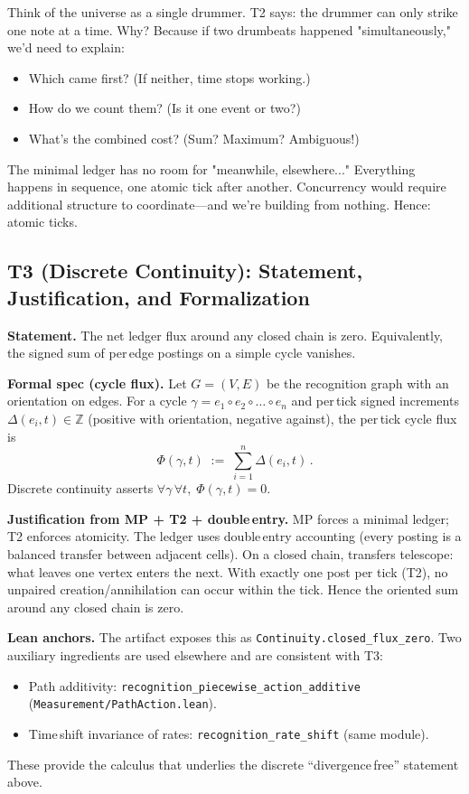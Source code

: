 \documentclass[11pt]{article}
\begin{document}
\begin{intuitionbox}
Think of the universe as a single drummer. T2 says: the drummer can only strike one note at a time. Why? Because if two drumbeats happened "simultaneously," we'd need to explain:
\begin{itemize}
  \item Which came first? (If neither, time stops working.)
  \item How do we count them? (Is it one event or two?)
  \item What's the combined cost? (Sum? Maximum? Ambiguous!)
\end{itemize}

The minimal ledger has no room for "meanwhile, elsewhere..." Everything happens in sequence, one atomic tick after another. Concurrency would require additional structure to coordinate—and we're building from nothing. Hence: atomic ticks.
\end{intuitionbox}

\subsection*{T3 (Discrete Continuity): Statement, Justification, and Formalization}
\textbf{Statement.} The net ledger flux around any closed chain is zero. Equivalently, the signed sum of per\,edge postings on a simple cycle vanishes.

\medskip
\textbf{Formal spec (cycle flux).} Let $G=(V,E)$ be the recognition graph with an orientation on edges. For a cycle $\gamma=e_1\circ e_2\circ\dots\circ e_n$ and per\,tick signed increments $\Delta(e_i,t)\in\mathbb Z$ (positive with orientation, negative against), the per\,tick cycle flux is
\begin{equation*}
  \Phi(\gamma,t) \;:=\; \sum_{i=1}^n \Delta(e_i,t)\,.
\end{equation*}
Discrete continuity asserts $\forall \gamma\,\forall t,\; \Phi(\gamma,t)=0$.

\textbf{Justification from MP + T2 + double\,entry.} MP forces a minimal ledger; T2 enforces atomicity. The ledger uses double\,entry accounting (every posting is a balanced transfer between adjacent cells). On a closed chain, transfers telescope: what leaves one vertex enters the next. With exactly one post per tick (T2), no unpaired creation/annihilation can occur within the tick. Hence the oriented sum around any closed chain is zero.

\textbf{Lean anchors.} The artifact exposes this as \texttt{Continuity.closed\_flux\_zero}. Two auxiliary ingredients are used elsewhere and are consistent with T3:
\begin{itemize}[leftmargin=*]
  \item Path additivity: \texttt{recognition\_piecewise\_action\_additive} (\texttt{Measurement/PathAction.lean}).
  \item Time\,shift invariance of rates: \texttt{recognition\_rate\_shift} (same module).
\end{itemize}
These provide the calculus that underlies the discrete “divergence\,free” statement above.
\end{document}
